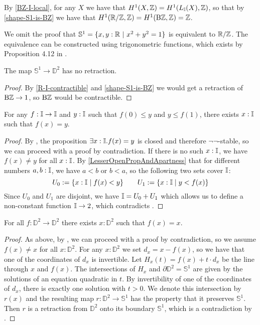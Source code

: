 \begin{remark}
By \cref{BZ-I-local}, for any $X$ we have that $H^1(X,\mathbb{Z}) = H^1(L_{\mathbb{I}}(X),\mathbb{Z})$, so that by \cref{shape-S1-is-BZ} we have that $H^1(\mathbb{R}/\mathbb{Z},\mathbb{Z}) = H^1(\mathrm{B}\mathbb{Z},\mathbb{Z}) = \mathbb{Z}$.
\end{remark}

We omit the proof that $\mathbb{S}^1=\{x,y:\mathbb{R}\ \vert\ x^2+y^2=1\}$ is equivalent to $\mathbb{R}/\mathbb{Z}$.
The equivalence can be constructed using trigonometric functions, which exists by Proposition 4.12 in \cite{Bishop}.

\begin{proposition}
\label{no-retraction}
The map $\mathbb{S}^1\to \mathbb{D}^2$ has no retraction.
\end{proposition}

\begin{proof}
By \cref{R-I-contractible} and \cref{shape-S1-is-BZ} we would get a retraction of $\mathrm{B}\mathbb{Z}\to 1$, so $\mathrm{B}\mathbb{Z}$ would be contractible.
\end{proof}

\begin{theorem}
  \label{ivt}
  For any $f: \mathbb{I}\to \mathbb{I}$ and $y:\mathbb{I}$ such that $f(0)\leq y$ and $y\leq f(1)$,
  there exists $x:\mathbb{I}$ such that $f(x)=y$.
\end{theorem}

\begin{proof}
  By , the proposition $\exists x:\mathbb{I}.f(x)=y$ is closed and therefore $\neg\neg$-stable, so we can proceed with a proof by contradiction.
  If there is no such $x:\mathbb{I}$, we have $f(x)\neq y$ for all $x:\mathbb{I}$.
  By \cref{LesserOpenPropAndApartness} that for different numbers $a,b:\mathbb{I}$, we have $a<b$ or $b<a$, so the following two sets cover $\mathbb{I}$:
  \[
    U_0:= \{x:\mathbb{I}\mid f(x)<y\} \quad\quad
    U_1:= \{x:\mathbb{I}\mid y<f(x)\}
    \]
  Since $U_0$ and $U_1$ are disjoint, we have $\mathbb{I}=U_0+U_1$ which allows us to define a non-constant function $\mathbb{I}\to 2$, which contradicts .
\end{proof}

\begin{theorem}
  For all $f:\mathbb{D}^2\to \mathbb{D}^2$ there exists $x:\mathbb{D}^2$ such that $f(x)=x$.
\end{theorem}

\begin{proof}
  As above, by , we can proceed with a proof by contradiction,
  so we assume $f(x)\neq x$ for all $x:\mathbb{D}^2$.
  For any $x:\mathbb{D}^2$ we set $d_x= x-f(x)$, so we have that one of the coordinates of $d_x$ is invertible.
  Let $H_x(t) = f(x) + t\cdot d_x $ be the line through $x$ and $f(x)$.
  The intersections of $H_x$ and $\partial\mathbb{D}^2=\mathbb{S}^1$ are given by the solutions of an equation quadratic in $t$. By invertibility of one of the coordinates of $d_x$, there is exactly one solution with $t> 0$.
  We denote this intersection by $r(x)$ and the resulting map $r:\mathbb D^2\to\mathbb S^1$ has the property that it preserves $\mathbb{S}^1$.
  Then $r$ is a retraction from $\mathbb{D}^2$ onto its boundary $\mathbb{S}^1$, which is a contradiction by .
\end{proof}
